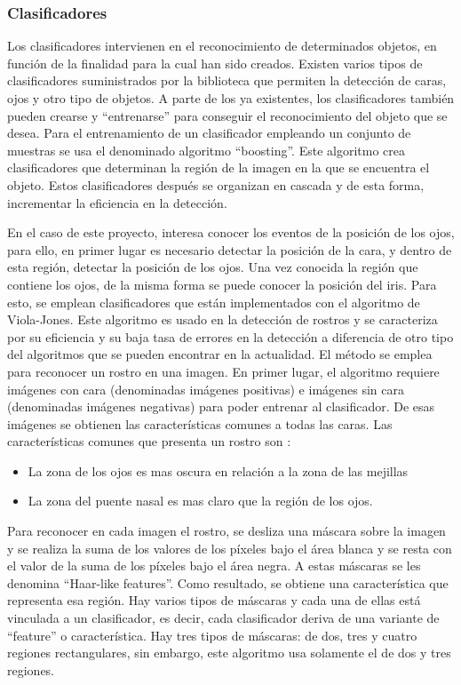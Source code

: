 \subsubsection{Clasificadores}\label{s2_2_1_1}

Los clasificadores intervienen en el reconocimiento de determinados objetos, en función de la finalidad para la cual han sido creados. Existen varios tipos de clasificadores suministrados por la biblioteca que permiten la detección de caras, ojos y otro tipo de objetos.
 A parte de los ya existentes, los clasificadores también pueden crearse y ``entrenarse'' para conseguir el reconocimiento del objeto que se desea. Para el entrenamiento de un clasificador empleando un conjunto de muestras se usa el denominado algoritmo ``boosting''. Este algoritmo crea clasificadores que determinan la región de la imagen en la que se encuentra el objeto. Estos clasificadores después se organizan en cascada y de esta forma, incrementar la eficiencia en la detección.

En el caso de este proyecto, interesa conocer los eventos de la posición de los ojos, para ello, en primer lugar es necesario detectar la posición de la cara, y dentro de esta región, detectar la posición de los ojos. Una vez conocida la región que contiene los ojos, de la misma forma se puede conocer la posición del iris. Para esto, se emplean clasificadores que están implementados con el algoritmo de Viola-Jones. Este algoritmo es usado en la detección de rostros y se caracteriza por su eficiencia y su baja tasa de errores en la detección a diferencia de otro tipo del algoritmos que se pueden encontrar en la actualidad. El método se emplea para reconocer un rostro en una imagen. En primer lugar, el algoritmo requiere imágenes con cara (denominadas imágenes positivas) e imágenes sin cara (denominadas imágenes negativas) para poder entrenar al clasificador. De esas imágenes se obtienen las características comunes a todas las caras.
Las características comunes que presenta un rostro son \citep{iglesias2016reconocimiento}:
\begin{itemize}
\item La zona de los ojos es mas oscura en relación a la zona de las mejillas
\item La zona del puente nasal es mas claro que la región de los ojos. 
\end{itemize}

Para reconocer en cada imagen el rostro, se desliza una máscara sobre la imagen y se realiza la suma de los valores de los píxeles bajo el área blanca y se resta con el valor de la suma de los píxeles bajo el área negra. A estas máscaras se les denomina ``Haar-like features''. Como resultado, se obtiene una característica que representa esa región. Hay varios tipos de máscaras y cada una de ellas está vinculada a un clasificador, es decir, cada clasificador deriva de una variante de ``feature'' o característica. Hay tres tipos de máscaras: de dos, tres y cuatro regiones rectangulares, sin embargo, este algoritmo usa solamente el de dos y tres regiones. 

